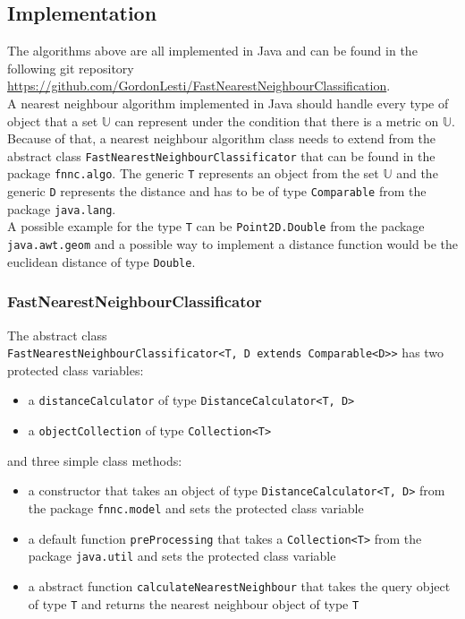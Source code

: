 \documentclass[runningheads,a4paper]{llncs}
\begin{document}
\subsection{Implementation}

The algorithms above are all implemented in Java and can be found in the following git repository\\
\url{https://github.com/GordonLesti/FastNearestNeighbourClassification}.\\

A nearest neighbour algorithm implemented in Java should handle every type of object that a set $\mathbb{U}$ can
represent under the condition that there is a metric on $\mathbb{U}$. Because of that, a nearest neighbour algorithm
class needs to extend from the abstract class \verb+FastNearestNeighbourClassificator+ that can be found in the package
\verb+fnnc.algo+. The generic \verb+T+ represents an object from the set $\mathbb{U}$ and the generic \verb+D+
represents the distance and has to be of type \verb+Comparable+ from the package \verb+java.lang+.\\

A possible example for the type \verb+T+ can be \verb+Point2D.Double+ from the package
\verb+java.awt.geom+ and a possible way to implement a distance function would be the euclidean distance of type
\verb+Double+.

\subsubsection{FastNearestNeighbourClassificator}

The abstract class\\ \verb+FastNearestNeighbourClassificator<T, D extends Comparable<D>>+ has two protected class
variables:
\begin{itemize}
	\item a \verb+distanceCalculator+ of type \verb+DistanceCalculator<T, D>+
	\item a \verb+objectCollection+ of type \verb+Collection<T>+
\end{itemize}
and three simple class methods:
\begin{itemize}
	\item a constructor that takes an object of type \verb+DistanceCalculator<T, D>+ from the package
		\verb+fnnc.model+ and sets the protected class variable
	\item a default function \verb+preProcessing+ that takes a \verb+Collection<T>+ from the package
		\verb+java.util+ and sets the protected class variable
	\item a abstract function \verb+calculateNearestNeighbour+ that takes the query object of type \verb+T+ and
		returns the nearest neighbour object of type \verb+T+
\end{itemize}
\end{document}
